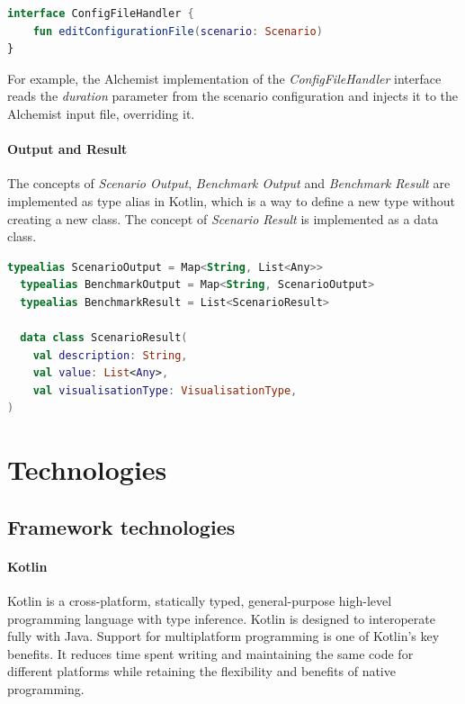 \documentclass[12pt,a4paper,openright,twoside]{book}
\begin{document}
\begin{lstlisting}[language=kt]
  interface ConfigFileHandler {
    fun editConfigurationFile(scenario: Scenario)
}
\end{lstlisting}

For example, the Alchemist implementation of the \emph{ConfigFileHandler} interface reads the \emph{duration} parameter from the scenario configuration and injects it to the Alchemist input file, overriding it.

\paragraph*{Output and Result}

The concepts of \emph{Scenario Output}, \emph{Benchmark Output} and \emph{Benchmark Result} are implemented as type alias in Kotlin, which is a way to define a new type without creating a new class.
The concept of \emph{Scenario Result} is implemented as a data class.

\begin{lstlisting}[language=kt]
  typealias ScenarioOutput = Map<String, List<Any>>
  typealias BenchmarkOutput = Map<String, ScenarioOutput>
  typealias BenchmarkResult = List<ScenarioResult>

  data class ScenarioResult(
    val description: String,
    val value: List<Any>,
    val visualisationType: VisualisationType,
)
\end{lstlisting}

\section{Technologies}

\subsection*{Framework technologies}

\paragraph*{Kotlin}

Kotlin is a cross-platform, statically typed, general-purpose high-level programming language with type inference.
Kotlin is designed to interoperate fully with Java.
Support for multiplatform programming is one of Kotlin’s key benefits. It reduces time spent writing and maintaining
the same code for different platforms while retaining the flexibility and benefits of native programming.
\end{document}
